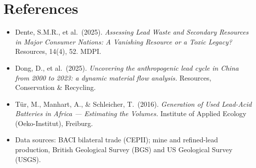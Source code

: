 \documentclass[11pt,a4paper]{article}
\begin{document}
\section{References}

\begin{itemize}[leftmargin=1.2em,itemsep=4pt]
  \item Dente, S.M.R., et al.\ (2025). \emph{Assessing Lead Waste and Secondary
        Resources in Major Consumer Nations: A Vanishing Resource or a Toxic Legacy?}
        Resources, 14(4), 52. MDPI.
  \item Dong, D., et al.\ (2025). \emph{Uncovering the anthropogenic lead cycle in China
        from 2000 to 2023: a dynamic material flow analysis.} Resources, Conservation
        \& Recycling.
  \item Tür, M., Manhart, A., \& Schleicher, T.\ (2016). \emph{Generation of Used
        Lead-Acid Batteries in Africa --- Estimating the Volumes.} Institute of Applied
        Ecology (Oeko-Institut), Freiburg.
  \item Data sources: BACI bilateral trade (CEPII); mine and refined-lead production,
        British Geological Survey (BGS) and US Geological Survey (USGS).
\end{itemize}
\end{document}
